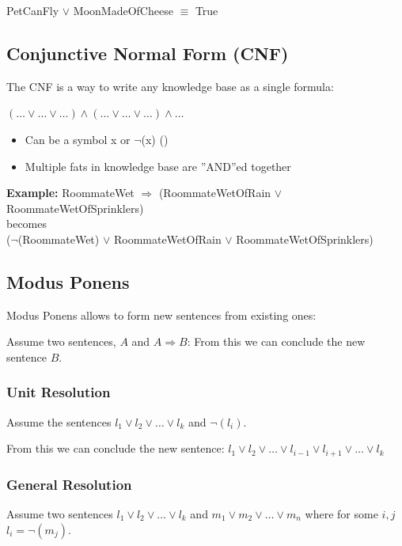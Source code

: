 \documentclass[
../../EiKI_Summary.tex,
]
{subfiles}
\begin{document}
PetCanFly $\lor$ MoonMadeOfCheese $\equiv$ True

\subsection{Conjunctive Normal Form (CNF)}
The CNF is a way to write any knowledge base as a single formula:

\begin{defbox}
    \begin{center}
        $(\dots\lor\dots\lor\dots) \land (\dots\lor\dots\lor\dots) \land \dots$
    \end{center}
    \begin{itemize}
        \item Can be a symbol x or $\neg$(x) ()
        \item Multiple fats in knowledge base are ''AND''ed together
    \end{itemize}
\end{defbox}

\textbf{Example:}
RoommateWet $\Rightarrow$ (RoommateWetOfRain $\lor$ RoommateWetOfSprinklers)\\
becomes\\
($\neg$(RoommateWet) $\lor$ RoommateWetOfRain $\lor$ RoommateWetOfSprinklers)

\subsection{Modus Ponens}
Modus Ponens allows to form new sentences from existing ones:

Assume two sentences, $A$ and $A \Rightarrow B$: From this we can conclude the new sentence $B$.

\subsubsection{Unit Resolution}
Assume the sentences $l_1 \lor l_2 \lor \dots \lor l_k$ and $\neg(l_i)$. 

From this we can conclude the new sentence: $l_1 \lor l_2 \lor \dots \lor l_{i-1} \lor l_{i+1} \lor \dots \lor l_k$

\subsubsection{General Resolution}
Assume two sentences $l_1 \lor l_2 \lor \dots \lor l_k$ and $m_1 \lor m_2 \lor \dots \lor m_n$ where for some $i,j$ $l_i = \neg(m_j)$. 
\end{document}
